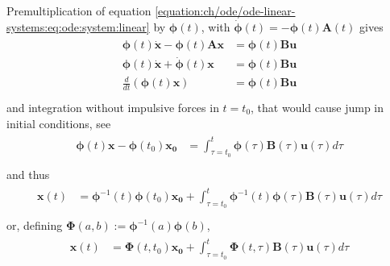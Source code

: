 \documentclass[letterpaper,10pt,english]{jupyterBook}
\begin{document}
\sphinxAtStartPar
Pre\sphinxhyphen{}multiplication of equation \eqref{equation:ch/ode/ode-linear-systems:eq:ode:system:linear} by \(\boldsymbol\phi(t)\), with \(\dot{\boldsymbol\phi}(t) = - \boldsymbol\phi(t) \mathbf{A}(t)\) gives
\begin{equation*}
\begin{split}\begin{aligned}
  \boldsymbol\phi(t) \dot{\mathbf{x}} - \boldsymbol\phi(t) \mathbf{A} \mathbf{x} & = \boldsymbol\phi(t) \mathbf{B} \mathbf{u} \\
  \boldsymbol\phi(t) \dot{\mathbf{x}} + \dot{\boldsymbol\phi}(t) \mathbf{x} & = \boldsymbol\phi(t) \mathbf{B} \mathbf{u} \\
  \frac{d}{dt} \left( \boldsymbol\phi(t) \mathbf{x} \right) & = \boldsymbol\phi(t) \mathbf{B} \mathbf{u} \\
\end{aligned}\end{split}
\end{equation*}
\sphinxAtStartPar
and integration \sphinxhyphen{} without impulsive forces in \(t = t_0\), that would cause jump in initial conditions, see {\hyperref[\detokenize{ch/system-theory/lti:ode-lti-impulsive-force}]{}} \sphinxhyphen{}
\begin{equation*}
\begin{split}\begin{aligned}
  \boldsymbol\phi(t) \mathbf{x} - \boldsymbol\phi(t_0) \mathbf{x_0} & = \int_{\tau=t_0}^{t} \boldsymbol\phi(\tau) \mathbf{B}(\tau) \mathbf{u}(\tau) d \tau \\
\end{aligned}\end{split}
\end{equation*}
\sphinxAtStartPar
and thus
\begin{equation*}
\begin{split}\begin{aligned}
   \mathbf{x}(t) & = \boldsymbol\phi^{-1}(t) \boldsymbol\phi(t_0) \mathbf{x_0} + \int_{\tau=t_0}^{t}  \boldsymbol\phi^{-1}(t)\boldsymbol\phi(\tau) \mathbf{B}(\tau) \mathbf{u}(\tau) d \tau \\
\end{aligned}\end{split}
\end{equation*}
\sphinxAtStartPar
or, defining \(\boldsymbol\Phi(a,b) := \boldsymbol\phi^{-1}(a) \boldsymbol\phi(b)\),
\begin{equation*}
\begin{split}\begin{aligned}
   \mathbf{x}(t) & = \boldsymbol\Phi(t,t_0) \mathbf{x_0} + \int_{\tau=t_0}^{t}  \boldsymbol\Phi(t,\tau) \mathbf{B}(\tau) \mathbf{u}(\tau) d \tau \\
\end{aligned}\end{split}
\end{equation*}
\end{document}
